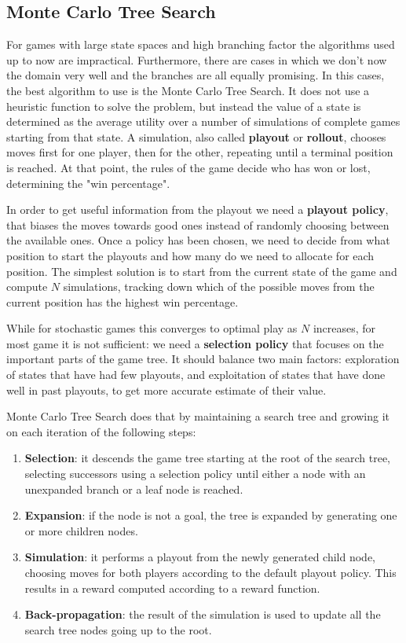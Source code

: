 \documentclass{article}
\begin{document}
\subsection{Monte Carlo Tree Search}
For games with large state spaces and high branching factor the algorithms used up to now are impractical. Furthermore, there are cases in which we don't now the domain very well and the branches are all equally promising. In this cases, the best algorithm to use is the Monte Carlo Tree Search. It does not use a heuristic function to solve the problem, but instead the value of a state is determined as the average utility over a number of simulations of complete games starting from that state. A simulation, also called \textbf{playout} or \textbf{rollout}, chooses moves first for one player, then for the other, repeating until a terminal position is reached. At that point, the rules of the game decide who has won or lost, determining the "win percentage".

In order to get useful information from the playout we need a \textbf{playout policy}, that biases the moves towards good ones instead of randomly choosing between the available ones. Once a policy has been chosen, we need to decide from what position to start the playouts and how many do we need to allocate for each position. The simplest solution is to start from the current state of the game and compute $N$ simulations, tracking down which of the possible moves from the current position has the highest win percentage.

While for stochastic games this converges to optimal play as $N$ increases, for most game it is not sufficient: we need a \textbf{selection policy} that focuses on the important parts of the game tree. It should balance two main factors: exploration of states that have had few playouts, and exploitation of states that have done well in past playouts, to get more accurate estimate of their value.

Monte Carlo Tree Search does that by maintaining a search tree and growing it on each iteration of the following steps:
\begin{enumerate}
    \item \textbf{Selection}: it descends the game tree starting at the root of the search tree, selecting successors using a selection policy until either a node with an unexpanded branch or a leaf node is reached.
    \item \textbf{Expansion}: if the node is not a goal, the tree is expanded by generating one or more children nodes.
    \item \textbf{Simulation}: it performs a playout from the newly generated child node, choosing moves for both players according to the default playout policy. This results in a reward computed according to a reward function.
    \item \textbf{Back-propagation}: the result of the simulation is used to update all the search tree nodes going up to the root.
\end{enumerate}
\end{document}
